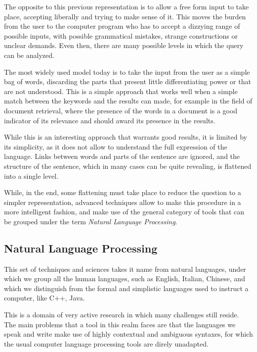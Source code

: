 The opposite to this previous representation is to allow a free form input to take place, accepting liberally and trying to make sense of it. This moves the burden from the user to the computer program who has to accept a dizzying range of possible inputs, with possible grammatical mistakes, strange constructions or unclear demands. Even then, there are many possible levels in which the query can be analyzed.

The most widely used model today is to take the input from the user as a simple bag of words, discarding the parts that present little differentiating power or that are not understood. This is a simple approach that works well when a simple match between the keywords and the results can made, for example in the field of document retrieval, where the presence of the words in a document is a good indicator of its relevance and should award its presence in the results.

While this is an interesting approach that warrants good results, it is limited by its simplicity, as it does not allow to understand the full expression of the language. Links between words and parts of the sentence are ignored, and the structure of the sentence, which in many cases can be quite revealing, is flattened into a single level.

While, in the end, some flattening must take place to reduce the question to a simpler representation, advanced techniques allow to make this procedure in a more intelligent fashion, and make use of the general category of tools that can be grouped under the term \emph{Natural Language Processing}.

\subsection{Natural Language Processing} %
\label{sub:natural_language_processing}

This set of techniques and sciences takes it name from natural languages, under which we group all the human languages, such as English, Italian, Chinese, and which we distinguish from the formal and simplistic languages used to instruct a computer, like C++, Java.

This is a domain of very active research in which many challenges still reside. The main problems that a tool in this realm faces are that the languages we speak and write make use of highly contextual and ambiguous syntaxes, for which the usual computer language processing tools are direly unadapted.

